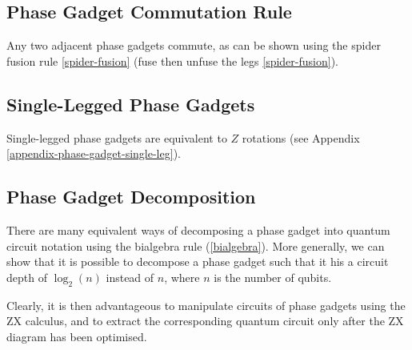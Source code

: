 

\subsection{Phase Gadget Commutation Rule}%
\label{phase-gadget-commutation}

Any two adjacent phase gadgets commute, as can be shown using the spider fusion rule \ref{spider-fusion} (fuse then unfuse the legs \ref{spider-fusion}).



\subsection{Single-Legged Phase Gadgets}%
\label{phase-gadget-single-leg}

Single-legged phase gadgets are equivalent to $Z$ rotations (see Appendix \ref{appendix-phase-gadget-single-leg}).



\subsection{Phase Gadget Decomposition}%
\label{phase-gadget-decomposition}

There are many equivalent ways of decomposing a phase gadget into quantum circuit notation using the bialgebra rule (\ref{bialgebra}). More generally, we can show that it is possible to decompose a phase gadget such that it his a circuit depth of $\log_2(n)$ instead of $n$, where $n$ is the number of qubits.


Clearly, it is then advantageous to manipulate circuits of phase gadgets using the ZX calculus, and to extract the corresponding quantum circuit only after the ZX diagram has been optimised.
